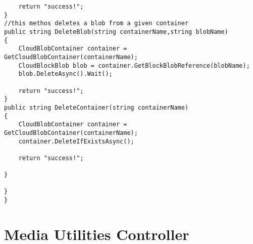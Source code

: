 \begin{lstlisting}
	return "success!";
}
//this methos deletes a blob from a given container
public string DeleteBlob(string containerName,string blobName)
{
	CloudBlobContainer container = GetCloudBlobContainer(containerName);
	CloudBlockBlob blob = container.GetBlockBlobReference(blobName);
	blob.DeleteAsync().Wait();

	return "success!";
}
public string DeleteContainer(string containerName)
{
	CloudBlobContainer container = GetCloudBlobContainer(containerName);
	container.DeleteIfExistsAsync();

	return "success!";

}

}
}
\end{lstlisting}


\section{Media Utilities Controller }

